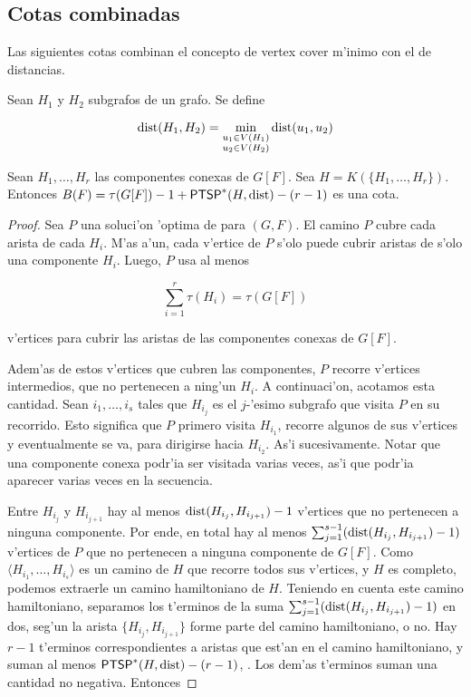 \subsection{Cotas combinadas}

Las siguientes cotas combinan el concepto de vertex cover m'inimo con el de distancias.

\begin{definition}
Sean $H_1$ y $H_2$ subgrafos de un grafo. Se define

\[\textnormal{dist}(H_1, H_2) = \min\limits_{\substack{u_1 \in V(H_1) \\ u_2 \in V(H_2)}} \textnormal{dist}(u_1, u_2)\]
\end{definition}

\begin{theorem}
Sean $H_1, \dots, H_r$ las componentes conexas de $G[F]$. Sea $H = K(\{H_1, \dots, H_r\})$. Entonces $B(F) = \tau(G[F]) - 1 + \textnormal{\textsf{PTSP}}^*(H, \textnormal{dist}) - (r - 1)$ es una cota.

\begin{proof}
Sea $P$ una soluci'on 'optima de  para $(G, F)$. El camino $P$ cubre cada arista de cada $H_i$. M'as a'un, cada v'ertice de $P$ s'olo puede cubrir aristas de s'olo una componente $H_i$. Luego, $P$ usa al menos

\begin{equation}
\label{eq:1}
\sum_{i = 1}^r\tau(H_i) = \tau(G[F])
\end{equation}

\noindent
v'ertices para cubrir las aristas de las componentes conexas de $G[F]$.

Adem'as de estos v'ertices que cubren las componentes, $P$ recorre v'ertices intermedios, que no pertenecen a ning'un $H_i$. A continuaci'on, acotamos esta cantidad. Sean $i_1, \dots, i_s$ tales que $H_{i_j}$ es el $j$-'esimo subgrafo que visita $P$ en su recorrido. Esto significa que $P$ primero visita $H_{i_1}$, recorre algunos de sus v'ertices y eventualmente se va, para dirigirse hacia $H_{i_2}$. As'i sucesivamente. Notar que una componente conexa podr'ia ser visitada varias veces, as'i que podr'ia aparecer varias veces en la secuencia.

Entre $H_{i_j}$ y $H_{i_{j + 1}}$ hay al menos $\textnormal{dist}(H_{i_j}, H_{i_{j + 1}}) - 1$ v'ertices que no pertenecen a ninguna componente. Por ende, en total hay al menos $\sum_{j = 1}^{s - 1} (\textnormal{dist}(H_{i_j}, H_{i_{j + 1}}) - 1)$ v'ertices de $P$ que no pertenecen a ninguna componente de $G[F]$. Como $\langle H_{i_1}, \dots, H_{i_s} \rangle$ es un camino de $H$ que recorre todos sus v'ertices, y $H$ es completo, podemos extraerle un camino hamiltoniano de $H$. Teniendo en cuenta este camino hamiltoniano, separamos los t'erminos de la suma $\sum_{j = 1}^{s - 1} (\textnormal{dist}(H_{i_j}, H_{i_{j + 1}}) - 1)$ en dos, seg'un la arista $\{H_{i_j}, H_{i_{j + 1}}\}$ forme parte del camino hamiltoniano, o no. Hay $r - 1$ t'erminos correspondientes a aristas que est'an en el camino hamiltoniano, y suman al menos $\textnormal{\textsf{PTSP}}^*(H, \textnormal{dist}) - (r - 1)$, . Los dem'as t'erminos suman una cantidad no negativa. Entonces


\end{proof}
\end{theorem}
